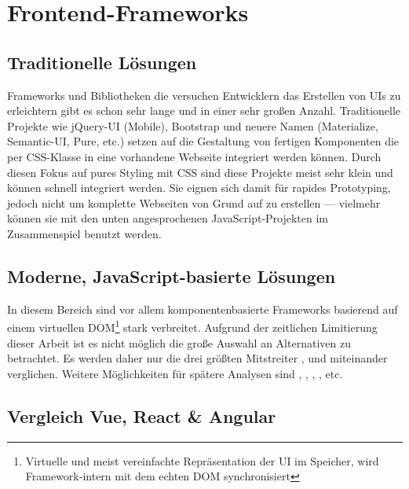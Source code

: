 \section{Frontend-Frameworks}
\subsection{Traditionelle Lösungen}
Frameworks und Bibliotheken die versuchen Entwicklern das Erstellen von UIs zu erleichtern gibt es schon sehr lange und in einer sehr großen Anzahl. Traditionelle Projekte wie jQuery-UI (Mobile), Bootstrap und neuere Namen (Materialize, Semantic-UI, Pure, etc.) setzen auf die Gestaltung von fertigen Komponenten die per CSS-Klasse in eine vorhandene Webseite integriert werden können. Durch diesen Fokus auf pures Styling mit CSS sind diese Projekte meist sehr klein und können schnell integriert werden. Sie eignen sich damit für rapides Prototyping, jedoch nicht um komplette Webseiten von Grund auf zu erstellen --- vielmehr können sie mit den unten angesprochenen JavaScript-Projekten im Zusammenspiel benutzt werden.

\subsection{Moderne, JavaScript-basierte Lösungen}
In diesem Bereich sind vor allem komponentenbasierte Frameworks basierend auf einem virtuellen DOM\footnote{Virtuelle und meist vereinfachte Repräsentation der UI im Speicher, wird Framework-intern mit dem echten DOM synchronisiert} stark verbreitet. Aufgrund der zeitlichen Limitierung dieser Arbeit ist es nicht möglich die große Auswahl an Alternativen zu betrachtet. Es werden daher nur die drei größten Mitstreiter ,  und  \parencite{greif_benitte_rambeau_2018} miteinander verglichen. Weitere Möglichkeiten für spätere Analysen sind , , , , etc.

\subsection{Vergleich Vue, React \& Angular}


